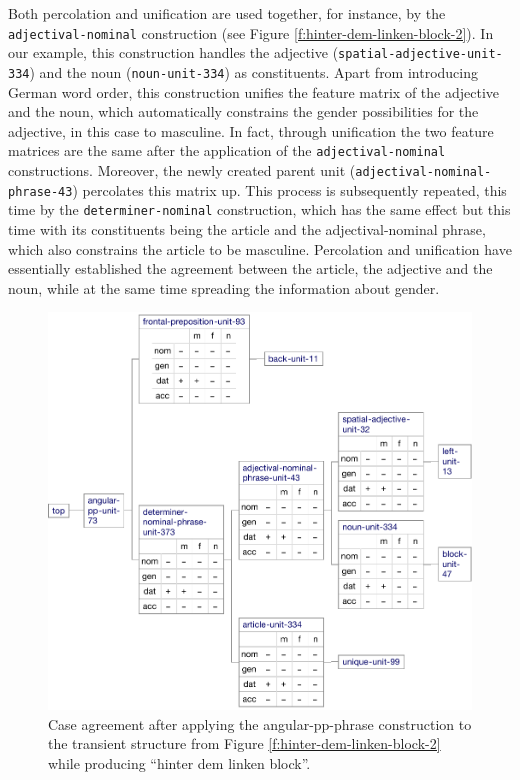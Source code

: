 Both percolation and unification are used together, for instance, by
the {\footnotesize\tt adjectival-nominal} construction (see Figure
\ref{f:hinter-dem-linken-block-2}). In our example, this construction
handles the adjective ({\footnotesize\texttt{spatial-adjective-unit-334}}) and
the noun ({\footnotesize\texttt{noun-unit-334}}) as constituents. Apart from introducing
German word order, this construction unifies the feature matrix of the
adjective and the noun, which automatically constrains the gender
possibilities for the adjective, in this case to masculine. In fact,
through unification the two feature matrices are the same after the
application of the {\footnotesize\tt adjectival-nominal}
constructions. Moreover, the newly created parent unit
({\footnotesize\texttt{adjectival-nominal-phrase-43}}) percolates this matrix
up. This process is subsequently repeated, this time by the
{\footnotesize\tt determiner-nominal} construction, which has the same effect
but this time with its constituents being the article and the
adjectival-nominal phrase, which also constrains the article to be
masculine. Percolation and unification have essentially
established the agreement between the article, the adjective and the
noun, while at the same time spreading the information about gender.


\begin{figure}[t]
  \centerline{\includegraphics[scale=0.61]{figs/hinter-dem-linken-block-3}}
  \caption[Case agreement represented in the transient structure]{%
  Case agreement after applying the angular-pp-phrase
    construction to the transient structure from Figure
    \ref{f:hinter-dem-linken-block-2} while producing ``hinter dem
    linken block''.}
  \label{f:hinter-dem-linken-block-3}
\end{figure}


